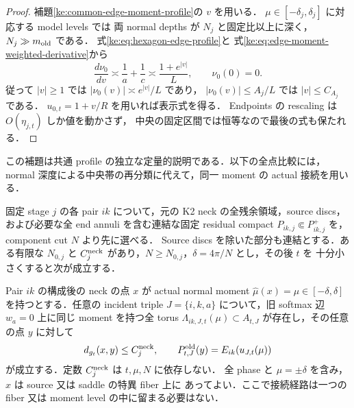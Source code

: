 \begin{proof}
補題\ref{ke:common-edge-moment-profile}の $v$ を用いる．
$\mu\in[-\delta_j,\delta_j]$ に対応する model levels では
両 normal depths が $N_j$ と固定比以上に深く，
$N_j\gg m_{\rm old}$ である．
式\eqref{ke:eq:hexagon-edge-profile}と
式\eqref{ke:eq:edge-moment-weighted-derivative}から
\[
 \frac{d\nu_0}{dv}\asymp
 \frac1a+\frac1c\asymp\frac{1+e^{|v|}}L,
 \qquad \nu_0(0)=0.
\]
従って $|v|\ge1$ では $|\nu_0(v)|\asymp e^{|v|}/L$ であり，
$|\nu_0(v)|\le A_j/L$ では $|v|\le C_{A_j}$ である．
$u_{0,t}=1+v/R$ を用いれば表示式を得る．
Endpoints の rescaling は $O(\eta_{j,t})$ しか値を動かさず，
中央の固定区間では恒等なので最後の式も保たれる．
\end{proof}

この補題は共通 profile の独立な定量的説明である．以下の全点比較には，
normal 深度による中央帯の再分類に代えて，同一 moment の actual 接続を用いる．

\begin{lemma}
\label{ke:same-moment-corner-reference}
固定 stage $j$ の各 pair $ik$ について，元の K2 neck の全残余領域，source discs，
および必要な全 end annuli を含む連結な固定 residual compact
$P_{ik,j}\Subset P^+_{ik,j}$ を，component cut $N$ より先に選べる．
Source discs を除いた部分も連結とする．ある有限な $N_{0,j}$ と
$C_j^{\rm neck}$ があり，$N\ge N_{0,j}$，$\delta=4\pi/N$ とし，その後 $t$ を
十分小さくすると次が成立する．

Pair $ik$ の構成後の neck の点 $x$ が actual normal moment
$\widehat\mu(x)=\mu\in[-\delta,\delta]$ を持つとする．任意の incident triple
$J=\{i,k,a\}$ について，旧 softmax 辺 $w_a=0$ 上に同じ moment を持つ全 torus
$\Lambda_{ik,J,t}(\mu)\subset A_{t,J}$ が存在し，その任意の点 $y$ に対して
\begin{equation}\label{ke:eq:same-moment-corner-reference}
 d_{g_t}(x,y)\le C_j^{\rm neck},\qquad
 P^{\rm old}_{t,J}(y)=E_{ik}(u_{J,t}(\mu))
\end{equation}
が成立する．定数 $C_j^{\rm neck}$ は $t,\mu,N$ に依存しない．
全 phase と $\mu=\pm\delta$ を含み，$x$ は source 又は saddle の特異 fiber 上に
あってよい．ここで接続経路は一つの fiber 又は moment level の中に留まる必要はない．
\end{lemma}


